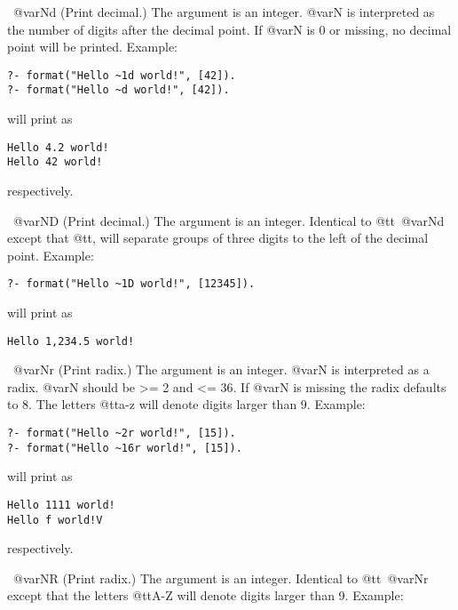\begin{description}
\begin{itemize}
{\item ~@var{N}d
(Print decimal.) The argument is an integer. @var{N} is interpreted as the
number of digits after the decimal point.  If @var{N} is 0 or missing, no
decimal point will be printed.  Example:  

\begin{verbatim}
?- format("Hello ~1d world!", [42]).
?- format("Hello ~d world!", [42]).
\end{verbatim}

\noindent
will print as

\begin{verbatim}
Hello 4.2 world!
Hello 42 world!
\end{verbatim}

\noindent
respectively.

\item ~@var{N}D
(Print decimal.) The argument is an integer.  Identical to @tt{~@var{N}d}
except that @tt{,} will separate groups of three digits to the left of the
decimal point.  Example:  

\begin{verbatim}
?- format("Hello ~1D world!", [12345]).
\end{verbatim}

\noindent
will print as

\begin{verbatim}
Hello 1,234.5 world!
\end{verbatim}

\item ~@var{N}r
(Print radix.) The argument is an integer. @var{N} is interpreted as a radix.
@var{N} should be >= 2 and <= 36.  If @var{N} is missing the radix defaults to
8.  The letters @tt{a-z} will denote digits larger than 9.  Example:  

\begin{verbatim}
?- format("Hello ~2r world!", [15]).
?- format("Hello ~16r world!", [15]).
\end{verbatim}

\noindent
will print as

\begin{verbatim}
Hello 1111 world!
Hello f world!V
\end{verbatim}

\noindent
respectively.

\item ~@var{N}R
(Print radix.) The argument is an integer.  Identical to @tt{~@var{N}r} except
that the letters @tt{A-Z} will denote digits larger than 9.  Example:  

}
\end{itemize}
\end{description}
